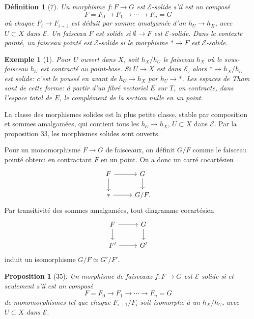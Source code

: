 \documentclass[11pt]{article}
\newcommand{\pt}{*}
\theoremstyle{deligne}
\newtheorem*{proposition*}{Proposition}
\newtheorem*{definition*}{Définition}
\newtheorem*{example*}{Exemple}
\begin{document}
\begin{definition*}[7]
Un morphisme \(f:F\to G\) est \(\mathcal E\)-solide s'il est un composé
\[
F=F_0\longrightarrow F_1\longrightarrow \cdots\longrightarrow F_n=G
\]
où chaque \(F_i\to F_{i+1}\) est déduit par somme amalgamée d'un \(h_U\to h_X\), avec \(U\subset X\) dans \(\mathcal E\). Un faisceau \(F\) est solide si \(\emptyset\to F\) est \(\mathcal E\)-solide. Dans le contexte pointé, un faisceau pointé est \(\mathcal E\)-solide si le morphisme \(\pt\to F\) est \(\mathcal E\)-solide.
\end{definition*}

\begin{example*}[1]
Pour \(U\) ouvert dans \(X\), soit \(h_X/h_U\) le faisceau \(h_X\) où le sous-faisceau \(h_U\) est contracté au point-base. Si \(U\to X\) est dans \(\mathcal E\), alors \(\pt\to h_X/h_U\) est solide: c'est le poussé en avant de \(h_U\to h_X\) par \(h_U\to\pt\). Les espaces de Thom sont de cette forme: à partir d'un fibré vectoriel \(E\) sur \(T\), on contracte, dans l'espace total de \(E\), le complément de la section nulle en un point.
\end{example*}

La classe des morphismes solides est la plus petite classe, stable par composition et sommes amalgamées, qui contient tous les \(h_U\to h_X\), \(U\subset X\) dans \(\mathcal E\). Par la proposition 33, les morphismes solides sont ouverts.

Pour un monomorphisme \(F\to G\) de faisceaux, on définit \(G/F\) comme le faisceau pointé obtenu en contractant \(F\) en un point. On a donc un carré cocartésien
\[
\begin{tikzcd}[column sep=2.6em,row sep=1.6em]
F \arrow[r] \arrow[d] & G \arrow[d]\\
\pt \arrow[r] & G/F .
\end{tikzcd}
\]
Par transitivité des sommes amalgamées, tout diagramme cocartésien
\[
\begin{tikzcd}[column sep=2.6em,row sep=1.6em]
F \arrow[r] \arrow[d] & G \arrow[d]\\
F' \arrow[r] & G'
\end{tikzcd}
\]
induit un isomorphisme \(G/F\simeq G'/F'\).

\begin{proposition*}[35]
Un morphisme de faisceaux \(f:F\to G\) est \(\mathcal E\)-solide si et seulement s'il est un composé
\[
F=F_0\longrightarrow F_1\longrightarrow \cdots\longrightarrow F_n=G
\]
de monomorphismes tel que chaque \(F_{i+1}/F_i\) soit isomorphe à un \(h_X/h_U\), avec \(U\subset X\) dans \(\mathcal E\).
\end{proposition*}
\end{document}
